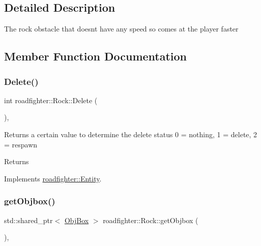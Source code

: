 \subsection{Detailed Description}
The rock obstacle that doesn\textquotesingle{}t have any speed so comes at the player faster 

\subsection{Member Function Documentation}
\mbox{\label{classroadfighter_1_1Rock_a7ac4934b909f1f988b64ac8afc84ea85}} 
\subsubsection{\texorpdfstring{Delete()}{Delete()}}
{\footnotesize\ttfamily int roadfighter\+::\+Rock\+::\+Delete (\begin{DoxyParamCaption}{ }\end{DoxyParamCaption})\hspace{0.3cm}{\ttfamily [override]}, {\ttfamily [virtual]}}

Returns a certain value to determine the delete status 0 = nothing, 1 = delete, 2 = respawn \begin{DoxyReturn}{Returns}

\end{DoxyReturn}


Implements \hyperlink{classroadfighter_1_1Entity_a08190b0b8e6a3fcdb42273d6096152ac}{roadfighter\+::\+Entity}.

\mbox{\label{classroadfighter_1_1Rock_a286656165c7dd3cdf66945e47f6fa4c7}} 
\subsubsection{\texorpdfstring{get\+Objbox()}{getObjbox()}}
{\footnotesize\ttfamily std\+::shared\+\_\+ptr$<$ \hyperlink{structObjBox}{Obj\+Box} $>$ roadfighter\+::\+Rock\+::get\+Objbox (\begin{DoxyParamCaption}{ }\end{DoxyParamCaption})\hspace{0.3cm}{\ttfamily [override]}, {\ttfamily [virtual]}}

